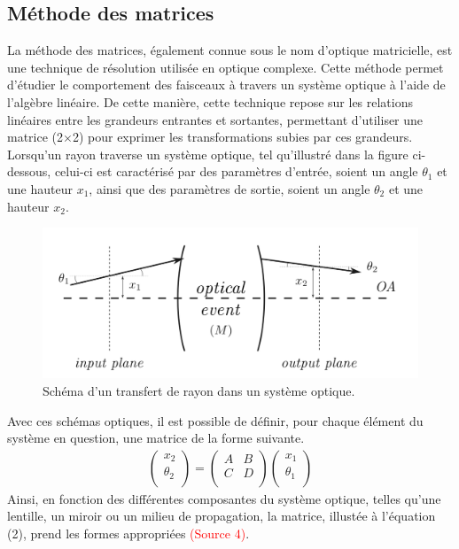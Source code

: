 \documentclass[11pt,letterpaper]{article}
\begin{document}
\subsection{Méthode des matrices}
La méthode des matrices, également connue sous le nom d'optique matricielle, est une technique de résolution utilisée en optique complexe. Cette méthode permet d'étudier le comportement des faisceaux à travers un système optique à l'aide de l'algèbre linéaire. De cette manière, cette technique repose sur les relations linéaires entre les grandeurs entrantes et sortantes, permettant d'utiliser une matrice (2$\times$2) pour exprimer les transformations subies par ces grandeurs. Lorsqu'un rayon traverse un système optique, tel qu'illustré dans la figure ci-dessous, celui-ci est caractérisé par des paramètres d'entrée, soient un angle $\theta_1$ et une hauteur $x_1$, ainsi que des paramètres de sortie, soient un angle $\theta_2$ et une hauteur $x_2$.
\begin{figure}[H]
  \centering
  \includegraphics[scale=0.5]{methode_math.png}
  \caption{Schéma d'un transfert de rayon dans un système optique.}
  \label{methode_math}
\end{figure}
Avec ces schémas optiques, il est possible de définir, pour chaque élément du système en question, une matrice de la forme suivante.
\begin{gather}
  \begin{pmatrix}
    x_2 \\
    \theta_2 \\
  \end{pmatrix}=
  \begin{pmatrix}
    A & B \\
    C & D \\
  \end{pmatrix}
  \begin{pmatrix}
    x_1 \\
    \theta_1 \\
  \end{pmatrix}
\end{gather}
Ainsi, en fonction des différentes composantes du système optique, telles qu'une lentille, un miroir ou un milieu de propagation, la matrice, illustée à l'équation (2), prend les formes appropriées \textcolor{red}{(Source 4)}.
\end{document}
